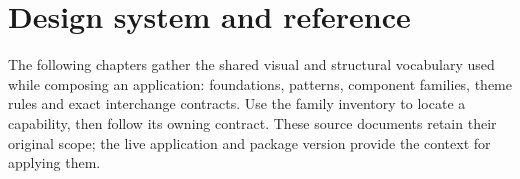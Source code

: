 \chapter*{Design system and reference}

The following chapters gather the shared visual and structural vocabulary used while composing an application: foundations, patterns, component families, theme rules and exact interchange contracts. Use the family inventory to locate a capability, then follow its owning contract. These source documents retain their original scope; the live application and package version provide the context for applying them.

%
%
%
%
%
%
%
%
%
%
%
%

